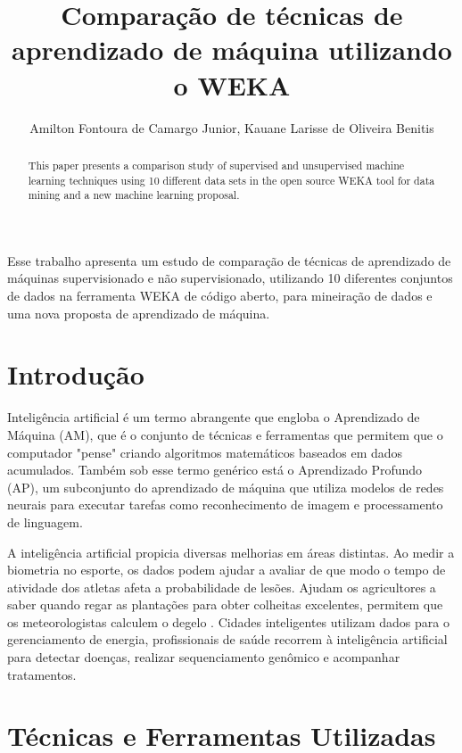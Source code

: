 \documentclass[12pt]{article}
\title{Comparação de técnicas de aprendizado de máquina utilizando o WEKA\\ }
\author{Amilton Fontoura de Camargo Junior\inst{1}, Kauane Larisse de Oliveira Benitis\inst{1}}
\begin{document}
 

\maketitle
\begin{abstract}
This paper presents a comparison study of supervised and unsupervised machine learning techniques using 10 different data sets in the open source WEKA tool for data mining and a new machine learning proposal.
\end{abstract}
     
\begin{resumo}
Esse trabalho apresenta um estudo de comparação de técnicas de aprendizado de máquinas supervisionado e não supervisionado, utilizando 10 diferentes conjuntos de dados na ferramenta WEKA de código aberto, para mineiração de dados e uma nova proposta de aprendizado de máquina.
\end{resumo}


\section{Introdução} \label{sec:intro}

	Inteligência artificial é um termo abrangente que engloba o Aprendizado de Máquina (AM), que é o conjunto de técnicas e ferramentas que permitem que o computador "pense" criando algoritmos matemáticos baseados em dados acumulados. Também sob esse termo genérico está o Aprendizado Profundo (AP), um subconjunto do aprendizado de máquina que utiliza modelos de redes neurais para executar tarefas como reconhecimento de imagem e processamento de linguagem.
	
	A inteligência artificial propicia diversas melhorias em áreas distintas. Ao medir a biometria no esporte, os dados podem ajudar a avaliar de que modo o tempo de atividade dos atletas afeta a probabilidade de lesões. Ajudam os agricultores a saber quando regar as plantações para obter colheitas excelentes, permitem que os meteorologistas calculem o degelo \cite{database}. Cidades inteligentes utilizam dados para o gerenciamento de energia, profissionais de saúde recorrem à inteligência artificial para detectar doenças, realizar sequenciamento genômico e acompanhar tratamentos.


\section{Técnicas e Ferramentas Utilizadas} \label{sec:tecnicas}
\end{document}
